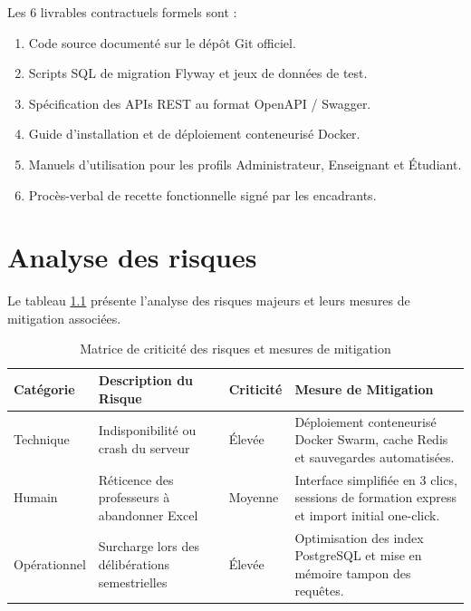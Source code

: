 \documentclass[11pt,a4paper]{report}
\begin{document}
Les 6 livrables contractuels formels sont :
\begin{enumerate}[leftmargin=1.5cm]
    \item Code source documenté sur le dépôt Git officiel.
    \item Scripts SQL de migration Flyway et jeux de données de test.
    \item Spécification des APIs REST au format OpenAPI / Swagger.
    \item Guide d'installation et de déploiement conteneurisé Docker.
    \item Manuels d'utilisation pour les profils Administrateur, Enseignant et Étudiant.
    \item Procès-verbal de recette fonctionnelle signé par les encadrants.
\end{enumerate}

\chapter{Analyse des risques}

Le tableau \ref{tab:risques} présente l'analyse des risques majeurs et leurs mesures de mitigation associées.

\begin{table}[h!]
\centering
\small
\renewcommand{\arraystretch}{1.4}
\begin{tabularx}{\textwidth}{|p{3cm}|X|p{2cm}|X|}
\hline
\rowcolor{tableheader}
\textbf{Catégorie} & \textbf{Description du Risque} & \textbf{Criticité} & \textbf{Mesure de Mitigation} \\
\hline
Technique & Indisponibilité ou crash du serveur & Élevée & Déploiement conteneurisé Docker Swarm, cache Redis et sauvegardes automatisées. \\
\hline
Humain & Réticence des professeurs à abandonner Excel & Moyenne & Interface simplifiée en 3 clics, sessions de formation express et import initial one-click. \\
\hline
Opérationnel & Surcharge lors des délibérations semestrielles & Élevée & Optimisation des index PostgreSQL et mise en mémoire tampon des requêtes. \\
\hline
\end{tabularx}
\caption{Matrice de criticité des risques et mesures de mitigation}
\label{tab:risques}
\end{table}
\end{document}
